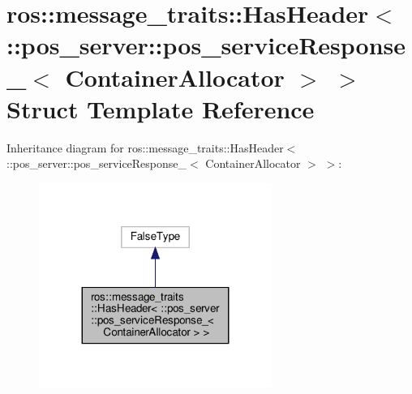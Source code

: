 \hypertarget{structros_1_1message__traits_1_1HasHeader_3_01_1_1pos__server_1_1pos__serviceResponse___3_01ContainerAllocator_01_4_01_4}{}\section{ros\+:\+:message\+\_\+traits\+:\+:Has\+Header$<$ \+:\+:pos\+\_\+server\+:\+:pos\+\_\+service\+Response\+\_\+$<$ Container\+Allocator $>$ $>$ Struct Template Reference}
\label{structros_1_1message__traits_1_1HasHeader_3_01_1_1pos__server_1_1pos__serviceResponse___3_01ContainerAllocator_01_4_01_4}


Inheritance diagram for ros\+:\+:message\+\_\+traits\+:\+:Has\+Header$<$ \+:\+:pos\+\_\+server\+:\+:pos\+\_\+service\+Response\+\_\+$<$ Container\+Allocator $>$ $>$\+:
\nopagebreak
\begin{figure}[H]
\begin{center}
\leavevmode
\includegraphics[width=215pt]{structros_1_1message__traits_1_1HasHeader_3_01_1_1pos__server_1_1pos__serviceResponse___3_01Cont652fc625f8c7b847f18930ee06acebbf}
\end{center}
\end{figure}


